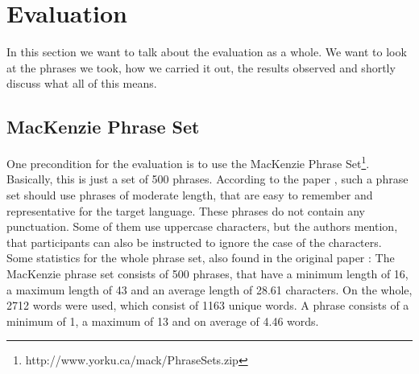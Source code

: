 \chapter{Evaluation}

In this section we want to talk about the evaluation as a whole. We want to look at the phrases we took, how we carried it out, the results observed and shortly discuss what all of this means.

\section{MacKenzie Phrase Set}
One precondition for the evaluation is to use the MacKenzie Phrase Set\footnote{http://www.yorku.ca/mack/PhraseSets.zip}. Basically, this is just a set of 500 phrases. According to the paper \cite{10.1145/765891.765971}, such a phrase set should use phrases of moderate length, that are easy to remember and representative for the target language. These phrases do not contain any punctuation. Some of them use uppercase characters, but the authors mention, that participants can also be instructed to ignore the case of the characters. 
\\
Some statistics for the whole phrase set, also found in the original paper \cite{10.1145/765891.765971}: The MacKenzie phrase set consists of 500 phrases, that have a minimum length of 16, a maximum length of 43 and an average length of 28.61 characters. On the whole, 2712 words were used, which consist of 1163 unique words. A phrase consists of a minimum of 1, a maximum of 13 and on average of 4.46 words.

